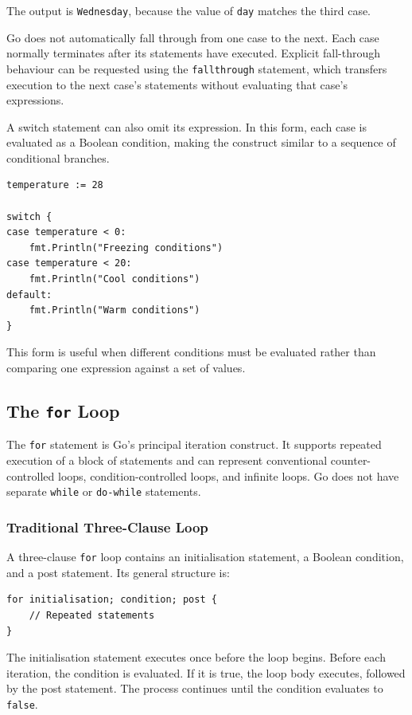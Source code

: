 The output is \texttt{Wednesday}, because the value of
\texttt{day} matches the third case.

Go does not automatically fall through from one case to
the next. Each case normally terminates after its statements
have executed. Explicit fall-through behaviour can be
requested using the \texttt{fallthrough} statement, which
transfers execution to the next case's statements without
evaluating that case's expressions.

A switch statement can also omit its expression. In this
form, each case is evaluated as a Boolean condition, making
the construct similar to a sequence of conditional branches.

\begin{lstlisting}
temperature := 28

switch {
case temperature < 0:
    fmt.Println("Freezing conditions")
case temperature < 20:
    fmt.Println("Cool conditions")
default:
    fmt.Println("Warm conditions")
}
\end{lstlisting}

This form is useful when different conditions must be evaluated
rather than comparing one expression against a set of values.

\subsection{The \texttt{for} Loop}

The \texttt{for} statement is Go's principal iteration
construct. It supports repeated execution of a block of
statements and can represent conventional counter-controlled
loops, condition-controlled loops, and infinite loops.
Go does not have separate \texttt{while} or \texttt{do-while}
statements.

\subsubsection{Traditional Three-Clause Loop}

A three-clause \texttt{for} loop contains an initialisation
statement, a Boolean condition, and a post statement. Its
general structure is:

\begin{lstlisting}
for initialisation; condition; post {
    // Repeated statements
}
\end{lstlisting}

The initialisation statement executes once before the loop
begins. Before each iteration, the condition is evaluated.
If it is true, the loop body executes, followed by the post
statement. The process continues until the condition evaluates
to \texttt{false}.

